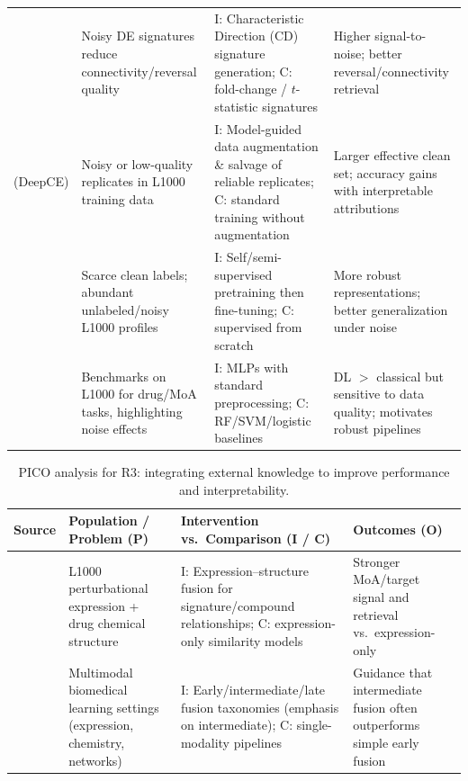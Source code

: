 \documentclass[twocolumn,12pt,a4paper]{article}
\begin{document}
{\begin{table}[t]
\begin{tabular}{p{3.1cm} p{4.8cm} p{5.8cm} p{3.3cm}}
    \cite{duan2016l1000cds2} &
    Noisy DE signatures reduce connectivity/reversal quality &
    I\@: Characteristic Direction (CD) signature generation; 
    C\@: fold-change / $t$-statistic signatures &
    Higher signal-to-noise; better reversal/connectivity retrieval \\[0.35em]

    \cite{pham2021deep} (DeepCE) &
    Noisy or low-quality replicates in L1000 training data &
    I\@: Model-guided data augmentation \& salvage of reliable replicates; 
    C\@: standard training without augmentation &
    Larger effective clean set; accuracy gains with interpretable attributions \\[0.35em]

    \cite{bang2024transfer} &
    Scarce clean labels; abundant unlabeled/noisy L1000 profiles &
    I\@: Self/semi-supervised pretraining then fine-tuning; 
    C\@: supervised from scratch &
    More robust representations; better generalization under noise \\[0.35em]

    \cite{mcdermott2019deep} &
    Benchmarks on L1000 for drug/MoA tasks, highlighting noise effects &
    I\@: MLPs with standard preprocessing; 
    C\@: RF/SVM/logistic baselines &
    DL $>$ classical but sensitive to data quality; motivates robust pipelines \\
    \bottomrule
  \end{tabular}
\end{table}

\begin{table}[t]
  \centering
  \caption{PICO analysis for R3: integrating external knowledge to improve performance and interpretability.}
  \begin{tabular}{p{3.1cm} p{4.8cm} p{5.8cm} p{3.3cm}}
    \toprule
    \textbf{Source} & \textbf{Population / Problem (P)} & \textbf{Intervention vs.\ Comparison (I / C)} & \textbf{Outcomes (O)} \\
    \midrule

    \cite{liu2015compound} &
    L1000 perturbational expression + drug chemical structure &
    I\@: Expression–structure fusion for signature/compound relationships; 
    C\@: expression-only similarity models &
    Stronger MoA/target signal and retrieval vs.\ expression-only \\[0.35em]

    \cite{stahlschmidt2022multimodal} &
    Multimodal biomedical learning settings (expression, chemistry, networks) &
    I\@: Early/intermediate/late fusion taxonomies (emphasis on intermediate); 
    C\@: single-modality pipelines &
    Guidance that intermediate fusion often outperforms simple early fusion \\[0.35em]


\end{tabular}
\end{table}}
\end{document}
